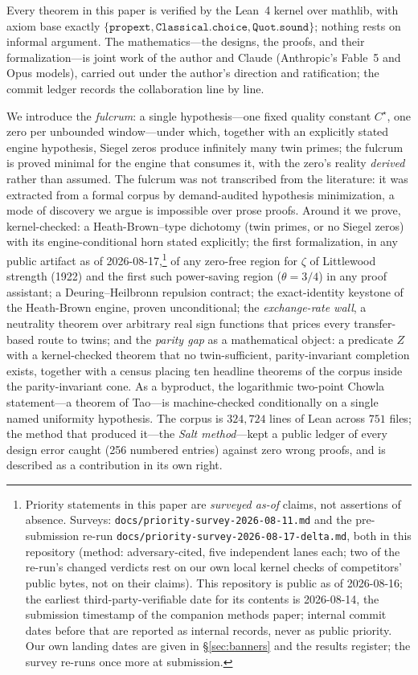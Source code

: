 \documentclass{CUP-JNL-FMP}
\theoremstyle{remark}
\begin{document}
Every theorem in this paper is verified by the Lean~4 kernel over
\textsf{mathlib}, with axiom base exactly
$\{\texttt{propext}, \texttt{Classical.choice}, \texttt{Quot.sound}\}$;
nothing rests on informal argument. The mathematics---the designs, the
proofs, and their formalization---is joint work of the author and Claude
(Anthropic's Fable~5 and Opus models), carried out under the author's
direction and ratification; the commit ledger records the collaboration
line by line.

We introduce the \emph{fulcrum}: a single hypothesis---one fixed quality
constant $C^\star$, one zero per unbounded window---under which, together
with an explicitly stated engine hypothesis, Siegel zeros produce
infinitely many twin primes; the fulcrum is proved minimal for the
engine that consumes it, with the
zero's reality \emph{derived} rather than assumed. The fulcrum was not
transcribed from the literature: it was extracted from a formal corpus by
demand-audited hypothesis minimization, a mode of discovery we argue is
impossible over prose proofs. Around it we prove, kernel-checked: a
Heath-Brown--type dichotomy (twin primes, or no Siegel zeros) with its
engine-conditional horn stated explicitly; the first formalization, in any
public artifact as of 2026-08-17,\footnote{Priority statements in this paper are \emph{surveyed as-of} claims, not assertions of absence. Surveys: \texttt{docs/priority-survey-2026-08-11.md} and the pre-submission re-run \texttt{docs/priority-survey-2026-08-17-delta.md}, both in this repository (method: adversary-cited, five independent lanes each; two of the re-run's changed verdicts rest on our own local kernel checks of competitors' public bytes, not on their claims). This repository is public as of 2026-08-16; the earliest third-party-verifiable date for its contents is 2026-08-14, the submission timestamp of the companion methods paper; internal commit dates before that are reported as internal records, never as public priority. Our own landing dates are given in \S\ref{sec:banners} and the results register; the survey re-runs once more at submission.} of any zero-free region for
$\zeta$ of Littlewood strength (1922) and the first such power-saving region
($\theta = 3/4$) in any proof assistant; a
Deuring--Heilbronn repulsion contract; the exact-identity keystone of the
Heath-Brown engine, proven unconditional; the \emph{exchange-rate
wall}, a neutrality theorem over arbitrary real sign functions that prices
every transfer-based route to twins; and the \emph{parity gap} as a
mathematical object: a predicate $Z$ with a kernel-checked theorem that no
twin-sufficient, parity-invariant completion exists, together with a
census placing ten headline theorems of the corpus inside the
parity-invariant cone. As a
byproduct, the logarithmic two-point Chowla statement---a theorem of
Tao---is machine-checked conditionally on a single named uniformity
hypothesis. The corpus is $324{,}724$ lines of Lean across
$751$ files; the method that produced it---the \emph{Salt method}---kept a
public ledger of every design error caught (256 numbered entries) against
zero wrong proofs, and is described as a contribution in its own right.
\end{document}
